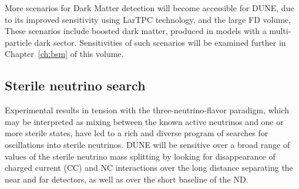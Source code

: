 More scenarios for Dark Matter detection will become accessible for DUNE, due to its improved sensitivity
using LarTPC technology, and the large FD volume, These scenarios include boosted dark matter, 
produced in models with 
a multi-particle dark sector. Sensitivities of such scenarios will be 
examined further in Chapter~\ref{ch:bsm} of this volume.


\subsection{Sterile neutrino search}
 Experimental results in tension with the three-neutrino-flavor paradigm, which may be interpreted
 as mixing between the known active neutrinos and one or more sterile states, have led to a rich
 and diverse program of searches for oscillations into sterile neutrinos. DUNE will be sensitive over a
 broad range of values of the sterile neutrino mass splitting by looking for disappearance of charged
 current (CC) and NC interactions over the long distance separating the near and far detectors,
 as well as over the short baseline of the ND. 

